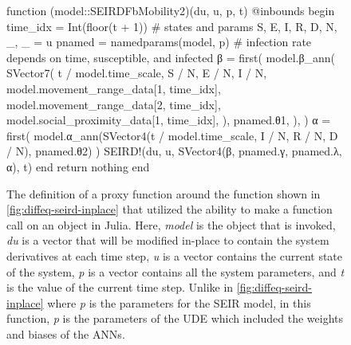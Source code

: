 \begin{figure}[!htb]
\centering
\begin{jllisting}
function (model::SEIRDFbMobility2)(du, u, p, t)
    @inbounds begin
        time_idx = Int(floor(t + 1))
        # states and params
        S, E, I, R, D, N, _, _ = u
        pnamed = namedparams(model, p)
        # infection rate depends on time, susceptible, and infected
        β = first(
            model.β_ann(
                SVector{7}(
                    t / model.time_scale,
                    S / N, E / N, I / N,
                    model.movement_range_data[1, time_idx],
                    model.movement_range_data[2, time_idx],
                    model.social_proximity_data[1, time_idx],
                ),
                pnamed.θ1,
            ),
        )
        α = first(
            model.α_ann(SVector{4}(t / model.time_scale,
                                   I / N, R / N, D / N),
                        pnamed.θ2)
        )
        SEIRD!(du, u, SVector{4}(β, pnamed.γ, pnamed.λ, α), t)
    end
    return nothing
end
\end{jllisting}
\caption{The definition of a proxy function around the function shown in \autoref{fig:diffeq-seird-inplace} that utilized the ability to make a function call on an object in Julia. Here, \textit{model} is the object that is invoked, \textit{du} is a vector that will be modified in-place to contain the system derivatives at each time step, \textit{u} is a vector contains the current state of the system, \textit{p} is a vector contains all the system parameters, and \textit{t} is the value of the current time step. Unlike in \autoref{fig:diffeq-seird-inplace} where \textit{p} is the parameters for the SEIR model, in this function, \textit{p} is the parameters of the \gls{UDE} which included the weights and biases of the \glspl{ANN}.}
\label{fig:diffeq-seird-fb2}
\end{figure}

